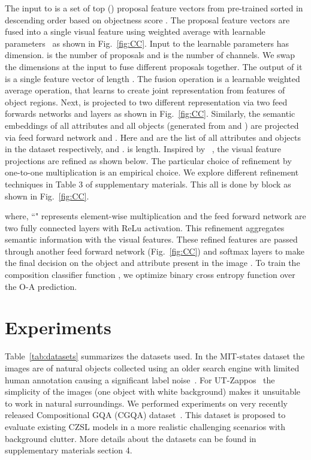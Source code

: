 \documentclass{bmvc2k}
\begin{document}
The input to   is a set of top  () proposal feature vectors from pre-trained   sorted in descending order based on objectness score . The proposal feature vectors are fused into a single visual feature  using weighted average with learnable parameters~\cite{kumar2021stressnet} as shown in Fig.~\ref{fig:CC}.
Input to the learnable parameters has  dimension.  is the number of proposals and  is the number of channels. We swap the dimensions at the input to fuse different proposals together. The output of it is a single feature vector of length .
The fusion operation is a learnable weighted average operation, that learns to create joint representation from features of object regions. 
Next,  is projected to two different representation via two feed forwards networks  and  layers as shown in Fig.~\ref{fig:CC}. 
Similarly, the semantic embeddings of all attributes  and all objects  (generated from  and ) are projected via feed forward network  and .
Here  and  are the list of all attributes and objects in the dataset respectively, and .  is length.
Inspired by ~\cite{vaswani2017attention,ulutan2020vsgnet,li2020symmetry,iftekhar2021gtnet,iftekhar2022look}, the visual feature projections are refined as shown below. 
The particular choice of refinement by one-to-one multiplication is an empirical choice. We explore different refinement techniques in Table 3 of supplementary materials.
This all is done by  block as shown in Fig.~\ref{fig:CC}.

where, ``" represents element-wise multiplication and the feed forward network are two fully connected layers with ReLu activation.
This refinement aggregates semantic information with the visual features. These refined features are passed through another feed forward network (Fig.~\ref{fig:CC}) and softmax layers to make the final decision on the object  and attribute  present in the image . To train the composition classifier function , we optimize binary cross entropy function over the O-A prediction.


%
 \vspace{-0.4cm}







\section{Experiments}\label{section:implementation}
\vspace{-0.15cm}
Table~\ref{tab:datasets} summarizes the datasets used. In the MIT-states dataset the images are of natural objects collected using an older search engine with limited human annotation causing a significant label noise~\cite{Atzmon_casual}. For UT-Zappos~\cite{yu2017semantic} the simplicity of the images (one object with white background) makes it unsuitable to work in natural surroundings. We performed experiments on very recently released Compositional GQA (CGQA) dataset~\cite{mancini2021learning,hudson2019gqa}. This dataset is proposed to evaluate existing CZSL models in a more realistic challenging scenarios with background clutter. More details about the datasets can be found in supplementary materials section 4. 
\end{document}
